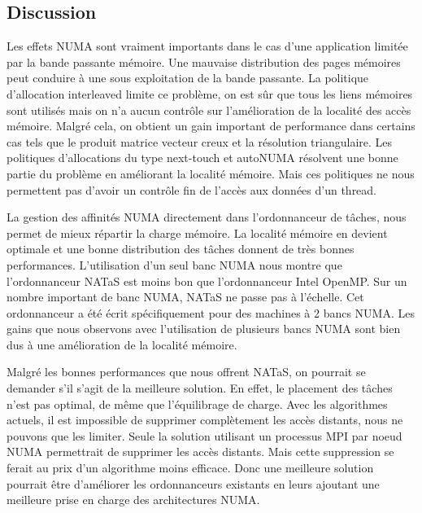 \subsection{Discussion}
Les effets NUMA sont vraiment importants dans le cas d'une application limitée par la bande passante mémoire.
%
Une mauvaise distribution des pages mémoires peut conduire à une sous exploitation de la bande passante.
%
La politique d'allocation interleaved limite ce problème, on est sûr que tous les liens mémoires sont utilisés mais on n'a aucun contrôle sur l'amélioration de la localité des accès mémoire.
%
Malgré cela, on obtient un gain important de performance dans certains cas tels que le produit matrice vecteur creux et la résolution triangulaire.
%
Les politiques d'allocations du type next-touch et autoNUMA résolvent une bonne partie du problème en améliorant la localité mémoire.
%
Mais ces politiques ne nous permettent pas d'avoir un contrôle fin de l'accès aux données d'un thread.



La gestion des affinités NUMA directement dans l'ordonnanceur de tâches, nous permet de mieux répartir la charge mémoire.
%
La localité mémoire en devient optimale et une bonne distribution des tâches donnent de très bonnes performances.
%
L'utilisation d'un seul banc NUMA nous montre que l'ordonnanceur NATaS est moins bon que l'ordonnanceur Intel OpenMP.
%
Sur un nombre important de banc NUMA, NATaS ne passe pas à l'échelle.
%
Cet ordonnanceur a été écrit spécifiquement pour des machines à 2 bancs NUMA.
%
Les gains que nous observons avec l'utilisation de plusieurs bancs NUMA sont bien dus à une amélioration de la localité mémoire.


Malgré les bonnes performances que nous offrent NATaS, on pourrait se demander s'il s'agit de la meilleure solution.
%
En effet, le placement des tâches n'est pas optimal, de même que l'équilibrage de charge.
%
Avec les algorithmes actuels, il est impossible de supprimer complètement les accès distants, nous ne pouvons que les limiter.
%
Seule la solution utilisant un processus MPI par noeud NUMA permettrait de supprimer les accès distants.
%
Mais cette suppression se ferait au prix d'un algorithme moins efficace.
%
Donc une meilleure solution pourrait être d'améliorer les ordonnanceurs existants en leurs ajoutant une meilleure prise en charge des architectures NUMA.


